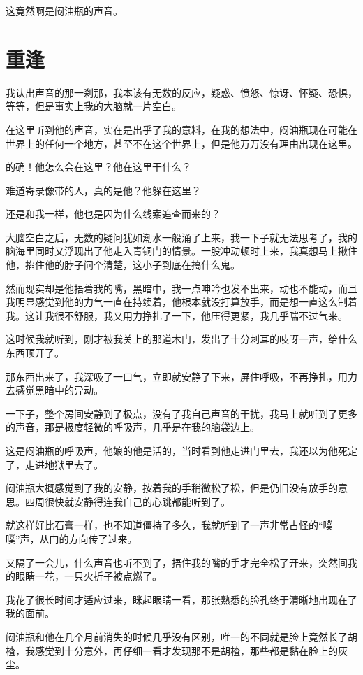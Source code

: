 这竟然啊是闷油瓶的声音。

\chapter{重逢}

我认出声音的那一刹那，我本该有无数的反应，疑惑、愤怒、惊讶、怀疑、恐惧，等等，但是事实上我的大脑就一片空白。

在这里听到他的声音，实在是出乎了我的意料，在我的想法中，闷油瓶现在可能在世界上的任何一个地方，甚至不在这个世界上，但是他万万没有理由出现在这里。

的确！他怎么会在这里？他在这里干什么？

难道寄录像带的人，真的是他？他躲在这里？

还是和我一样，他也是因为什么线索追查而来的？

大脑空白之后，无数的疑问犹如潮水一般涌了上来，我一下子就无法思考了，我的脑海里同时又浮现出了他走入青铜门的情景。一股冲动顿时上来，我真想马上揪住他，掐住他的脖子问个清楚，这小子到底在搞什么鬼。

然而现实却是他捂着我的嘴，黑暗中，我一点呻吟也发不出来，动也不能动，而且我明显感觉到他的力气一直在持续着，他根本就没打算放手，而是想一直这么制着我。这让我很不舒服，我又用力挣扎了一下，他压得更紧，我几乎喘不过气来。

这时候我就听到，刚才被我关上的那道木门，发出了十分刺耳的吱呀一声，给什么东西顶开了。

那东西出来了，我深吸了一口气，立即就安静了下来，屏住呼吸，不再挣扎，用力去感觉黑暗中的异动。

一下子，整个房间安静到了极点，没有了我自己声音的干扰，我马上就听到了更多的声音，那是极度轻微的呼吸声，几乎是在我的脑袋边上。

这是闷油瓶的呼吸声，他娘的他是活的，当时看到他走进门里去，我还以为他死定了，走进地狱里去了。

闷油瓶大概感觉到了我的安静，按着我的手稍微松了松，但是仍旧没有放手的意思。四周很快就安静得连我自己的心跳都能听到了。

就这样好比石膏一样，也不知道僵持了多久，我就听到了一声非常古怪的“噗噗”声，从门的方向传了过来。

又隔了一会儿，什么声音也听不到了，捂住我的嘴的手才完全松了开来，突然间我的眼睛一花，一只火折子被点燃了。

我花了很长时间才适应过来，眯起眼睛一看，那张熟悉的脸孔终于清晰地出现在了我的面前。

闷油瓶和他在几个月前消失的时候几乎没有区别，唯一的不同就是脸上竟然长了胡楂，我感觉到十分意外，再仔细一看才发现那不是胡楂，那些都是黏在脸上的灰尘。


